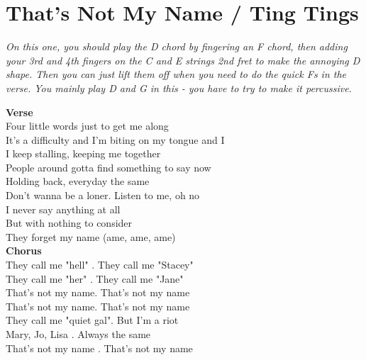 \section{That's Not My Name / Ting Tings}\label{sec:thatsnotmyname}
\DmajorEasy
\Fmajor
\Gmajor
\Amajor

\emph{On this one, you should play the D chord by fingering an F chord, then adding your 3rd and 4th fingers on the C and E strings 2nd fret to make the annoying D shape. Then you can just lift them off when you need to do the quick Fs in the verse. You mainly play D and G in this - you have to try to make it percussive.}

\textbf{Verse}\\
Four little words just to get me along \\
It's a difficulty and I'm biting on my tongue and I\\
I keep stalling, keeping me together \\
People around gotta find something to say now \\
Holding back, everyday the same \\
Don't wanna be a loner. Listen to me, oh no \\
I never say anything at all \\
But with nothing to consider\\
They forget my name (ame, ame, ame) \\
\textbf{Chorus}\\
They call me "hell" . They call me "Stacey" \\
They call me "her" . They call me "Jane" \\
That's not my name. That's not my name \\
That's not my name. That's not my name \\
They call me "quiet gal". But I'm a riot \\
Mary, Jo, Lisa . Always the same \\
That's not my name . That's not my name \\
